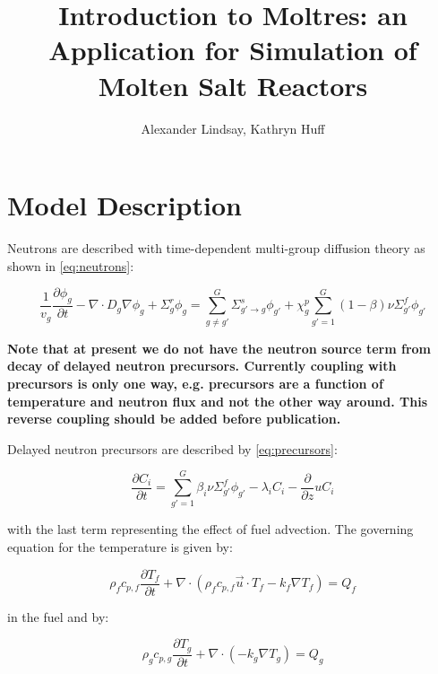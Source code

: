 \documentclass{article}
\title{Introduction to Moltres: an Application for Simulation of Molten Salt Reactors}
\author{Alexander Lindsay, Kathryn Huff}
\let\Oldsection\section
\renewcommand{\section}{\FloatBarrier\Oldsection}
\begin{document}
\maketitle

\section{Model Description}

Neutrons are described with time-dependent multi-group diffusion theory as shown
in \cref{eq:neutrons}:

\begin{equation}
\frac{1}{v_g}\frac{\partial \phi_g}{\partial t} - \nabla \cdot D_g \nabla \phi_g
+ \Sigma_g^r \phi_g = \sum_{g \ne g'}^G \Sigma_{g'\rightarrow g}^s \phi_{g'} + \chi_g^p \sum_{g' = 1}^G (1 - \beta)
\nu \Sigma_{g'}^f \phi_{g'}
\label{eq:neutrons}
\end{equation}

\textbf{Note that at present we do not have the neutron source term from decay
  of delayed neutron precursors. Currently coupling with precursors is only one
  way, e.g. precursors are a function of temperature and neutron flux and not
  the other way around. This reverse coupling should be added before publication.}

Delayed neutron precursors are described by \cref{eq:precursors}:

\begin{equation}
\frac{\partial C_i}{\partial t} = \sum_{g'= 1}^G \beta_i \nu \Sigma_{g'}^f
\phi_{g'} - \lambda_i C_i - \frac{\partial}{\partial z} u C_i
\label{eq:precursors}
\end{equation}

with the last term representing the effect of fuel advection. The governing
equation for the temperature is given by:

\begin{equation}
  \rho_fc_{p,f}\frac{\partial T_f}{\partial t} + \nabla\cdot\left(\rho_f c_{p,f}
  \vec{u}\cdot T_f -k_f\nabla T_f\right) =  Q_f
  \label{eq:fuel_temp}
\end{equation}

in the fuel and by:

\begin{equation}
  \rho_gc_{p,g}\frac{\partial T_g}{\partial t} + \nabla\cdot\left(-k_g\nabla T_g\right) =  Q_g
  \label{eq:moderator_temp}
\end{equation}
\end{document}
